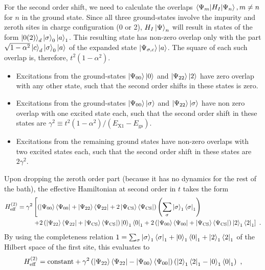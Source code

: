 For the second order shift, we need to calculate the overlaps \(\braket{\Psi_m | H_I | \Psi_n}, m\neq n\) for \(n\) in the ground state. Since all three ground-states involve the impurity and zeroth sites in charge configuration (0 or 2), \(H_I\ket{\Psi}_n\) will result in states of the form \(\ket{0(2)}_d\ket{\sigma}_0\ket{a}_1\). This resulting state has non-zero overlap only with the part \(\sqrt{1 - \alpha^2}\ket{c}_d\ket{\sigma}_0\ket{a}\) of the expanded state \(\ket{\Psi_{\sigma,c}}\ket{a}\). The square of each such overlap is, therefore, \(t^2\left( 1 - \alpha^2 \right) \). 
\begin{itemize}
	\item Excitations from the ground-states \(\ket{\Psi_{00}}\ket{0}\) and \(\ket{\Psi_{22}}\ket{2}\) have zero overlap with any other state, such that the second order shifts in these states is zero.
	\item Excitations from the ground-states \(\ket{\Psi_{00}}\ket{\sigma}\) and \(\ket{\Psi_{22}}\ket{\sigma}\) have non zero overlap with one excited state each, such that the second order shift in these states are \(\gamma^2 \equiv t^2\left( 1 - \alpha^2 \right) / \left(E_\text{X1} - E_\text{gs}\right) \).
	\item Excitations from the remaining ground states have non-zero overlaps with two excited states each, such that the second order shift in these states are \(2\gamma^2\).
\end{itemize}
Upon dropping the zeroth order part (because it has no dynamics for the rest of the bath), the effective Hamiltonian at second order in \(t\) takes the form
\begin{eqnarray}
	H_\text{eff}^{(2)} = \gamma^2 &\left[\left(\ket{\Psi_{00}}\bra{\Psi_{00}} + \ket{\Psi_{22}}\bra{\Psi_{22}} + 2\ket{\Psi_\text{CS}}\bra{\Psi_\text{CS}}\right)\left(\sum_\sigma \ket{\sigma}_1\bra{\sigma}_1\right) \right.\nonumber \\
				      &\left.  + 2\left(\ket{\Psi_{22}}\bra{\Psi_{22}} + \ket{\Psi_\text{CS}}\bra{\Psi_\text{CS}}\right) \ket{0}_1\bra{0}_1+2\left(\ket{\Psi_{00}}\bra{\Psi_{00}} + \ket{\Psi_\text{CS}}\bra{\Psi_\text{CS}}\right)\ket{2}_1\bra{2}_1\right]~.
\end{eqnarray}
By using the completeness relation \(1 = \sum_\sigma \ket{\sigma}_1\bra{\sigma}_1 + \ket{0}_1\bra{0}_1 + \ket{2}_1\bra{2}_1\) of the Hilbert space of the first site, this evaluates to
\begin{eqnarray}
	H_\text{eff}^{(2)} = \text{constant} + \gamma^2 \left(\ket{\Psi_{22}}\bra{\Psi_{22}} - \ket{\Psi_{00}}\bra{\Psi_{00}} \right) \left(\ket{2}_1\bra{2}_1 - \ket{0}_1\bra{0}_1\right) ~,
\end{eqnarray}
